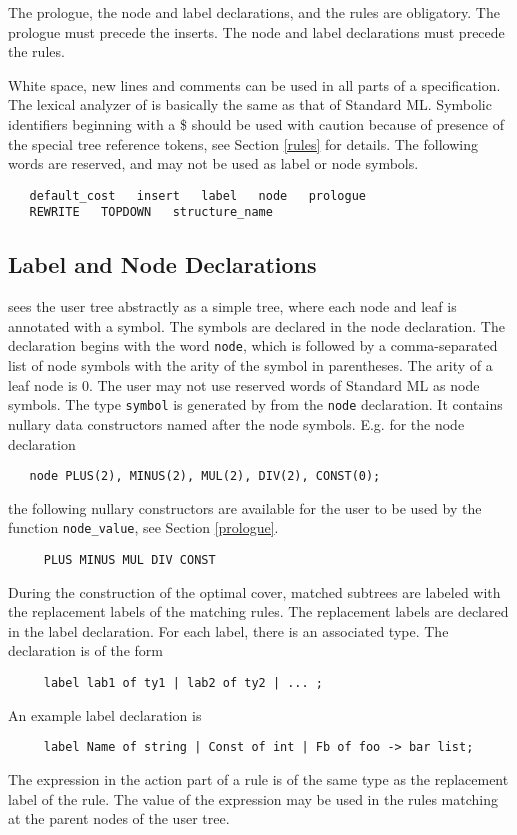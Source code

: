 The prologue, the node and label declarations, and the rules
are obligatory. The prologue must precede the inserts.
The node and label declarations must precede the rules.

White space, new lines and comments can be used in all parts of a
specification. The lexical analyzer of \mltwig is basically the same
as that of Standard ML. Symbolic identifiers beginning with a \$
should be used with caution because of presence of the special tree reference
tokens, see Section \ref{rules} for details.
The following words are reserved, and may not be used as label or node symbols.

\begin{verbatim}
   default_cost   insert   label   node   prologue
   REWRITE   TOPDOWN   structure_name
\end{verbatim}

\subsection{Label and Node Declarations}

\mltwig sees the user tree abstractly as a simple tree, where each node
and leaf is annotated with a symbol.
The symbols are declared in the node declaration.
The declaration begins with the word {\tt node}, which is followed
by a comma-separated list of node symbols with the arity of the symbol
in parentheses. The arity of a leaf node is 0.
The user may not use reserved words of Standard ML as node symbols.
The type {\tt symbol} is generated by \mltwig from the {\tt node} declaration.
It contains nullary data constructors named after the node symbols.
E.g. for the node declaration
\begin{verbatim}
   node PLUS(2), MINUS(2), MUL(2), DIV(2), CONST(0);
\end{verbatim}
the following nullary constructors are available for the user to be
used by the function {\tt node\_value}, see Section \ref{prologue}.
\begin{verbatim}
     PLUS MINUS MUL DIV CONST
\end{verbatim}

During the construction of the optimal cover, matched subtrees are labeled with
the replacement labels of the matching rules. The replacement
labels are declared in the label declaration. For each label, there
is an associated type. The declaration is of the form
\begin{verbatim}
     label lab1 of ty1 | lab2 of ty2 | ... ;
\end{verbatim}
An example label declaration is
\begin{verbatim}
     label Name of string | Const of int | Fb of foo -> bar list;
\end{verbatim}
The expression in the action part of a rule is of the same type as
the replacement label of the rule. The value of the expression may
be used in the rules matching at the parent nodes of the user tree.

